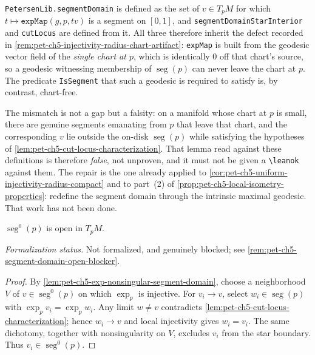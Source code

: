 \begin{remark}
  \label{rem:pet-ch5-segment-domain-chart-artifact}
  \texttt{PetersenLib.segmentDomain} is defined as the set of $v\in T_pM$ for which
  $t\mapsto\texttt{expMap}(g,p,tv)$ is a segment on $[0,1]$, and
  \texttt{segmentDomainStarInterior} and \texttt{cutLocus} are defined from it.
  All three therefore inherit the defect recorded in
  \cref{rem:pet-ch5-injectivity-radius-chart-artifact}: \texttt{expMap} is built
  from the geodesic vector field of the \emph{single chart at $p$}, which is
  identically $0$ off that chart's source, so a geodesic witnessing membership of
  $\operatorname{seg}(p)$ can never leave the chart at $p$. The predicate
  \texttt{IsSegment} that such a geodesic is required to satisfy is, by contrast,
  chart-free.

  The mismatch is not a gap but a falsity: on a manifold whose chart at $p$ is
  small, there are genuine segments emanating from $p$ that leave that chart, and
  the corresponding $v$ lie outside the on-disk $\operatorname{seg}(p)$ while
  satisfying the hypotheses of \cref{lem:pet-ch5-cut-locus-characterization}. That
  lemma read against these definitions is therefore \emph{false}, not unproven, and
  it must not be given a \texttt{\textbackslash leanok} against them. The repair is
  the one already applied to
  \cref{cor:pet-ch5-uniform-injectivity-radius-compact} and to part~(2) of
  \cref{prop:pet-ch5-local-isometry-properties}: redefine the segment domain
  through the intrinsic maximal geodesic. That work has not been done.
\end{remark}

\begin{proposition}
  \label{prop:pet-ch5-segment-domain-open}
  \notready
  \notready
  $\operatorname{seg}^0(p)$ is open in $T_pM$.

  \emph{Formalization status.} Not formalized, and genuinely blocked; see
  \cref{rem:pet-ch5-segment-domain-open-blocker}.
\end{proposition}
\begin{proof}
  \sketch
  By \cref{lem:pet-ch5-exp-nonsingular-segment-domain}, choose a neighborhood $V$
  of $v\in\operatorname{seg}^0(p)$ on which $\exp_p$ is injective.  For
  $v_i\to v$, select $w_i\in\operatorname{seg}(p)$ with
  $\exp_pv_i=\exp_pw_i$.  Any limit $w\ne v$ contradicts
  \cref{lem:pet-ch5-cut-locus-characterization}; hence $w_i\to v$ and local
  injectivity gives $w_i=v_i$.  The same dichotomy, together with nonsingularity
  on $V$, excludes $v_i$ from the star boundary.  Thus $v_i\in\operatorname{seg}^0(p)$.
\end{proof}

